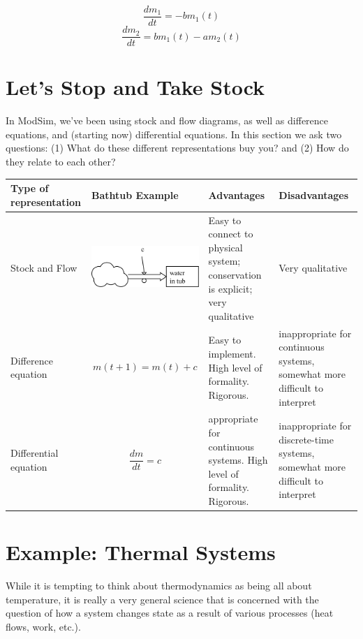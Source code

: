 $$\frac{dm_1}{dt} = -bm_1(t)$$
$$\frac{dm_2}{dt} = bm_1(t)-am_2(t)$$

 
 \section{Let's Stop and Take Stock} 
 
In ModSim, we've been using stock and flow diagrams, as well as difference equations, and (starting now) differential equations.  In this section we ask two questions: (1) What do these different representations buy you? and (2) How do they relate to each other?

\begin{center}
\begin{tabular}{ | p{2cm} | p{5.5cm} | p{2.5cm}   | p{2.5cm}  |}
\hline
Type of representation & Bathtub Example & Advantages & Disadvantages \\
\hline
Stock and Flow & \vspace{0.05in} \includegraphics[height=.7in]{figs/stockandflowbathtub}\vspace{0.05in} & Easy to connect to physical system; conservation is explicit; very qualitative & Very qualitative \\
\hline
Difference equation & $$m(t+1) = m(t) + c$$ & Easy to implement. High level of formality.  Rigorous. & inappropriate for continuous systems, somewhat more difficult to interpret \\
\hline
Differential equation & $$\frac{dm}{dt} = c$$ & appropriate for continuous systems. High level of formality.  Rigorous. & inappropriate for discrete-time systems, somewhat more difficult to interpret \\
\hline
\end{tabular}
\end{center}



 \section{Example: Thermal Systems}

While it is tempting to think about thermodynamics as being all about temperature, it is really a very general science that is concerned with the question of how a system changes state as a result of various processes (heat flows, work, etc.).  

